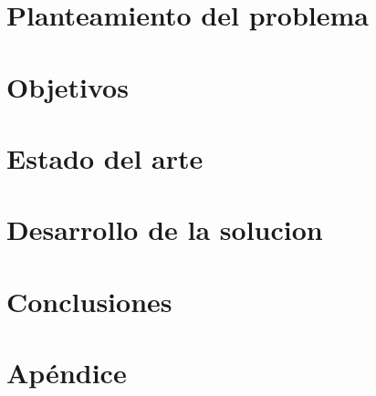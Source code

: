 \documentclass[book,spanish,a4paper,12pt]{tfg}
\begin{document}
\chapter{Planteamiento del problema}


\chapter{Objetivos}


\chapter{Estado del arte}


\chapter{Desarrollo de la solucion}
% 




% 


\chapter{Conclusiones}



\pagestyle{appendix}

\appendix
\chapter{Apéndice}




\end{document}
